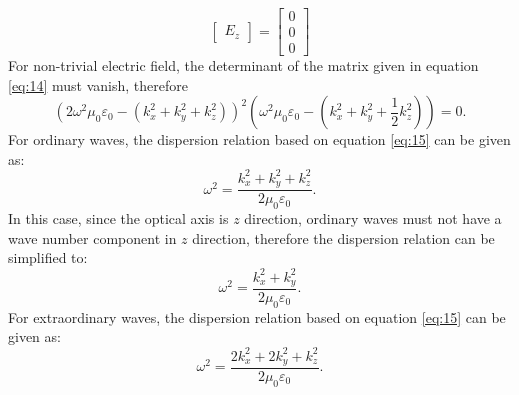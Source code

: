 \documentclass[11pt]{amsart}
\begin{document}
\begin{enumerate}
\begin{enumerate}
\begin{equation}
\begin{bmatrix}
E_z
\end{bmatrix}
=
\begin{bmatrix}
0\\ 
0\\ 
0
\end{bmatrix}
\end{equation}
For non-trivial electric field, the determinant of the matrix given in equation \ref{eq:14} must vanish, therefore
\begin{equation}
\label{eq:15}
(2\omega^2 \mu_0 \varepsilon_{0}-(k_{x}^2+k_{y}^2+k_{z}^2))^2(\omega^2 \mu_{0} \varepsilon_{0}-(k_{x}^2+k_{y}^2+\frac{1}{2}k_{z}^2))=0.
\end{equation}
For ordinary waves, the dispersion relation based on equation \ref{eq:15} can be given as:
\begin{equation}
\omega^2=\frac{k_{x}^2+k_{y}^2+k_{z}^2}{2 \mu_0 \varepsilon_{0}}.
\end{equation}
In this case, since the optical axis is $z$ direction, ordinary waves must not have a wave number component in $z$ direction, therefore the dispersion relation can be simplified to:
\begin{equation}
\label{eq:16}
\omega^2=\frac{k_{x}^2+k_{y}^2}{2 \mu_0 \varepsilon_{0}}.
\end{equation}
For extraordinary waves, the dispersion relation based on equation \ref{eq:15} can be given as:
\begin{equation}
\label{eq:17}
\omega^2=\frac{2 k_{x}^2+2k_{y}^2+k_{z}^2}{2 \mu_0 \varepsilon_{0}}.
\end{equation}
\end{enumerate}


\end{enumerate}
\end{document}

